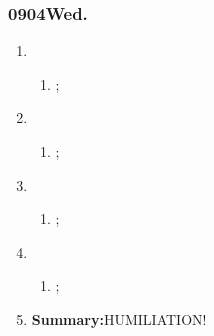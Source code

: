 \subsubsection{0904Wed.}
\begin{enumerate}
	\item \ncquaone
	\begin{enumerate}[(1)]
		\item ;\rightundoneBlack
	\end{enumerate}
	
	\item \ncquatwo	
	\begin{enumerate}[(1)]
		\item ;\rightundoneBlack
	\end{enumerate}
	
	\item \ncquathree
	\begin{enumerate}[(1)]
		\item ;\rightundoneBlack
	\end{enumerate}
	
	\item \ncquafour	
	\begin{enumerate}[(1)]
		\item ;\rightundoneBlack
	\end{enumerate}
	\item \textbf{Summary:}HUMILIATION! 
\end{enumerate}

